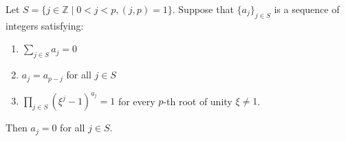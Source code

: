 Let $S = \{j \in \mathbb{Z} \mid 0 < j < p, (j, p) = 1\}$. Suppose that $\{a_j\}_{j \in S}$ is a sequence of integers satisfying:
\begin{enumerate}
\item[(1)] $\sum_{j \in S} a_j = 0$
\item[(2)] $a_j = a_{p-j}$ for all $j \in S$
\item[(3)] $\prod_{j \in S} (\xi^j - 1)^{a_j} = 1$ for every $p$-th root of unity $\xi \neq 1$.
\end{enumerate}
Then $a_j = 0$ for all $j \in S$.
